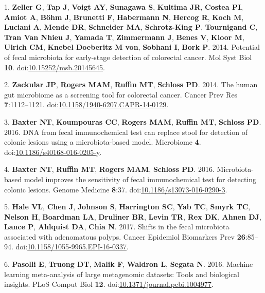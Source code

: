 \documentclass[11pt,]{article}
\begin{document}
\hypertarget{refs}{}
\hypertarget{ref-zeller_potential_2014}{}
1. \textbf{Zeller G}, \textbf{Tap J}, \textbf{Voigt AY},
\textbf{Sunagawa S}, \textbf{Kultima JR}, \textbf{Costea PI},
\textbf{Amiot A}, \textbf{Böhm J}, \textbf{Brunetti F},
\textbf{Habermann N}, \textbf{Hercog R}, \textbf{Koch M},
\textbf{Luciani A}, \textbf{Mende DR}, \textbf{Schneider MA},
\textbf{Schrotz-King P}, \textbf{Tournigand C}, \textbf{Tran Van Nhieu
J}, \textbf{Yamada T}, \textbf{Zimmermann J}, \textbf{Benes V},
\textbf{Kloor M}, \textbf{Ulrich CM}, \textbf{Knebel Doeberitz M von},
\textbf{Sobhani I}, \textbf{Bork P}. 2014. Potential of fecal microbiota
for early-stage detection of colorectal cancer. Mol Syst Biol
\textbf{10}.
doi:\href{https://doi.org/10.15252/msb.20145645}{10.15252/msb.20145645}.

\hypertarget{ref-zackular_human_2014}{}
2. \textbf{Zackular JP}, \textbf{Rogers MAM}, \textbf{Ruffin MT},
\textbf{Schloss PD}. 2014. The human gut microbiome as a screening tool
for colorectal cancer. Cancer Prev Res \textbf{7}:1112--1121.
doi:\href{https://doi.org/10.1158/1940-6207.CAPR-14-0129}{10.1158/1940-6207.CAPR-14-0129}.

\hypertarget{ref-baxter_dna_2016}{}
3. \textbf{Baxter NT}, \textbf{Koumpouras CC}, \textbf{Rogers MAM},
\textbf{Ruffin MT}, \textbf{Schloss PD}. 2016. DNA from fecal
immunochemical test can replace stool for detection of colonic lesions
using a microbiota-based model. Microbiome \textbf{4}.
doi:\href{https://doi.org/10.1186/s40168-016-0205-y}{10.1186/s40168-016-0205-y}.

\hypertarget{ref-baxter_microbiota-based_2016}{}
4. \textbf{Baxter NT}, \textbf{Ruffin MT}, \textbf{Rogers MAM},
\textbf{Schloss PD}. 2016. Microbiota-based model improves the
sensitivity of fecal immunochemical test for detecting colonic lesions.
Genome Medicine \textbf{8}:37.
doi:\href{https://doi.org/10.1186/s13073-016-0290-3}{10.1186/s13073-016-0290-3}.

\hypertarget{ref-hale_shifts_2017}{}
5. \textbf{Hale VL}, \textbf{Chen J}, \textbf{Johnson S},
\textbf{Harrington SC}, \textbf{Yab TC}, \textbf{Smyrk TC},
\textbf{Nelson H}, \textbf{Boardman LA}, \textbf{Druliner BR},
\textbf{Levin TR}, \textbf{Rex DK}, \textbf{Ahnen DJ}, \textbf{Lance P},
\textbf{Ahlquist DA}, \textbf{Chia N}. 2017. Shifts in the fecal
microbiota associated with adenomatous polyps. Cancer Epidemiol
Biomarkers Prev \textbf{26}:85--94.
doi:\href{https://doi.org/10.1158/1055-9965.EPI-16-0337}{10.1158/1055-9965.EPI-16-0337}.

\hypertarget{ref-pasolli_machine_2016}{}
6. \textbf{Pasolli E}, \textbf{Truong DT}, \textbf{Malik F},
\textbf{Waldron L}, \textbf{Segata N}. 2016. Machine learning
meta-analysis of large metagenomic datasets: Tools and biological
insights. PLoS Comput Biol \textbf{12}.
doi:\href{https://doi.org/10.1371/journal.pcbi.1004977}{10.1371/journal.pcbi.1004977}.
\end{document}
